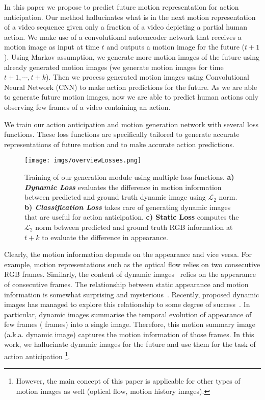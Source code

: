In this paper we propose to predict future motion representation for action anticipation. 
Our method hallucinates what is in the next motion representation of a video sequence given only a fraction of a video depicting a partial human action. 
We make use of a convolutional autoencoder network that receives a motion image as input at time $t$ and outputs a motion image for the future (\eg $t+1$). 
Using Markov assumption, we generate more motion images of the future using already generated motion images (\ie we generate motion images for time $t+1, \cdots, t+k$).
Then we process generated motion images using Convolutional Neural Network (CNN) to make action predictions for the future.
As we are able to generate future motion images, now we are able to predict human actions only observing few frames of a video containing an action.  

We train our action anticipation and motion generation network with several loss functions.
These loss functions are specifically tailored to generate accurate representations of future motion and to make accurate action predictions.
%
\begin{figure}[t]
    \centering
    \texttt{[image: imgs/overviewLosses.png]}
    \caption{Training of our generation module using multiple loss functions. \textbf{a) \textit{Dynamic Loss}} evaluates the difference in motion information between predicted and ground truth dynamic image using $\mathcal{L}_2$ norm. \textbf{b) \textit{Classification Loss}} takes care of generating dynamic images that are useful for action anticipation. \textbf{c) Static Loss} computes the $\mathcal{L}_2$ norm between predicted and ground truth RGB information at $t+k$ to evaluate the difference in appearance.} 
    \label{fig:losses}
\end{figure}

Clearly, the motion information depends on the appearance and vice versa. 
For example, motion representations such as the optical flow relies on two consecutive RGB frames. 
Similarly, the content of dynamic images~\cite{Bilen2017} relies on the appearance of consecutive frames.
The relationship between static appearance and motion information is somewhat surprising and mysterious~\cite{Carreira2017}. 
Recently, proposed dynamic images has managed to explore this relationship to some degree of success~\cite{Bilen2017}. 
In particular, dynamic images summarise the temporal evolution of appearance of few frames ( frames) into a single image.
Therefore, this motion summary image (a.k.a. dynamic image) captures the motion information of those frames.
In this work, we hallucinate dynamic images for the future and use them for the task of action anticipation
\footnote{However, the main concept of this paper is applicable for other types of motion images as well (optical flow, motion history images).}.

